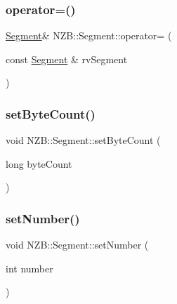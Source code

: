\hypertarget{class_n_z_b_1_1_segment_a1ea88973387e81c1e83f6b05a1030e1a}{}\label{class_n_z_b_1_1_segment_a1ea88973387e81c1e83f6b05a1030e1a} 
\subsubsection{\texorpdfstring{operator=()}{operator=()}\hspace{0.1cm}{\footnotesize\ttfamily [2/2]}}
{\footnotesize\ttfamily \hyperlink{class_n_z_b_1_1_segment}{Segment}\& N\+Z\+B\+::\+Segment\+::operator= (\begin{DoxyParamCaption}\item[{const \hyperlink{class_n_z_b_1_1_segment}{Segment} \&}]{rv\+Segment }\end{DoxyParamCaption})\hspace{0.3cm}{\ttfamily [default]}}

\hypertarget{class_n_z_b_1_1_segment_a00d5dd3d50ec687f8e66e241c1431f9b}{}\label{class_n_z_b_1_1_segment_a00d5dd3d50ec687f8e66e241c1431f9b} 
\subsubsection{\texorpdfstring{set\+Byte\+Count()}{setByteCount()}}
{\footnotesize\ttfamily void N\+Z\+B\+::\+Segment\+::set\+Byte\+Count (\begin{DoxyParamCaption}\item[{long}]{byte\+Count }\end{DoxyParamCaption})\hspace{0.3cm}{\ttfamily [inline]}}

\hypertarget{class_n_z_b_1_1_segment_aabe9d205530740251c739ba756a56174}{}\label{class_n_z_b_1_1_segment_aabe9d205530740251c739ba756a56174} 
\subsubsection{\texorpdfstring{set\+Number()}{setNumber()}}
{\footnotesize\ttfamily void N\+Z\+B\+::\+Segment\+::set\+Number (\begin{DoxyParamCaption}\item[{int}]{number }\end{DoxyParamCaption})\hspace{0.3cm}{\ttfamily [inline]}}



